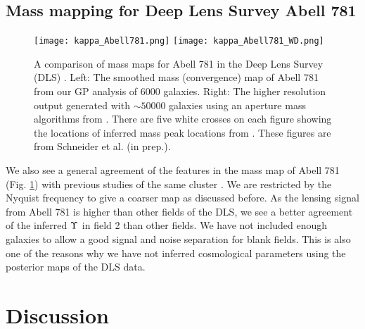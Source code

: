 \subsection{Mass mapping for Deep Lens Survey Abell 781}
\begin{figure}[h!]
	\centering
	\texttt{[image: kappa\_Abell781.png]}
	\texttt{[image: kappa\_Abell781\_WD.png]}
	\caption{A comparison of mass maps for Abell 781 in the Deep Lens Survey (DLS) 
		\label{fig:Abell781_massmap}.  Left: The smoothed mass (convergence) map of Abell 781 from 
		our GP analysis of 6000 galaxies.
		Right: The higher resolution output generated with $\sim 50000$ galaxies using an aperture
		mass algorithms from \cite{Wittman2014}. 
		There are five white crosses on each figure showing the locations of inferred mass
		peak locations from \cite{Sehgal2008}. 
	These figures are from Schneider et al. (in prep.).
}
\end{figure}
We also see a general agreement of the features in the mass map of Abell 781
(Fig. \ref{fig:Abell781_massmap}) with previous studies of the same cluster 
\cite{Wittman2014}.  
We are restricted by the Nyquist frequency to give a coarser map as discussed
before.   
As the lensing signal from Abell 781 is higher than other fields of the
DLS, we see a better agreement of the inferred $\Upsilon$ in field 2 than
other fields. We have not included enough galaxies to allow a good signal and
noise separation for blank fields. 
This is also one of the reasons why  we
 have not inferred cosmological parameters using the
posterior maps of the DLS data.



\section{Discussion}

